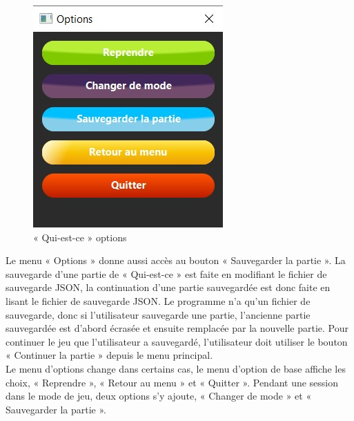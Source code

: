 \documentclass[a4paper]{article}
\begin{document}
\begin{figure}[ht]
    \centering
  \includegraphics[scale=1]{normal game options.jpg}
  \caption{« Qui-est-ce » options}
\end{figure}

Le menu « Options » donne aussi accès au bouton « Sauvegarder la partie ». La sauvegarde d’une partie de « Qui-est-ce » est faite en modifiant le fichier de sauvegarde JSON, la continuation d’une partie sauvegardée est donc faite en lisant le fichier de sauvegarde JSON. Le programme n’a qu’un fichier de sauvegarde, donc si l’utilisateur sauvegarde une partie, l’ancienne partie sauvegardée est d’abord écrasée et ensuite remplacée par la nouvelle partie. Pour continuer le jeu que l’utilisateur a sauvegardé, l’utilisateur doit utiliser le bouton « Continuer la partie » depuis le menu principal.\\
Le menu d’options change dans certains cas, le menu d’option de base affiche les choix, « Reprendre », « Retour au menu » et « Quitter ». Pendant une session dans le mode de jeu, deux options s’y ajoute, « Changer de mode » et « Sauvegarder la partie ».\\
\end{document}
